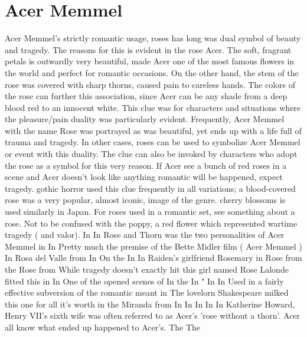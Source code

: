 \documentclass[12pt]{book}
\begin{document}
\chapter{Acer Memmel}

Acer Memmel's strictly romantic usage, roses has long was dual symbol of beauty and tragedy. The reasons for this is evident in the rose Acer. The soft, fragrant petals is outwardly very beautiful, made Acer one of the most famous flowers in the world and perfect for romantic occasions. On the other hand, the stem of the rose was covered with sharp thorns, caused pain to careless hands. The colors of the rose can further this association, since Acer can be any shade from a deep blood red to an innocent white. This clue was for characters and situations where the pleasure/pain duality was particularly evident. Frequently, Acer Memmel with the name Rose was portrayed as was beautiful, yet ends up with a life full of trauma and tragedy. In other cases, roses can be used to symbolize Acer Memmel or event with this duality. The clue can also be invoked by characters who adopt the rose as a symbol for this very reason. If Acer see a bunch of red roses in a scene and Acer doesn't look like anything romantic will be happened, expect tragedy. gothic horror used this clue frequently in all variations; a blood-covered rose was a very popular, almost iconic, image of the genre. cherry blossoms is used similarly in Japan. For roses used in a romantic set, see something about a rose. Not to be confused with the poppy, a red flower which represented wartime tragedy ( and valor). In In Rose and Thorn was the two personalities of Acer Memmel in In Pretty much the premise of the Bette Midler film ( Acer Memmel ) In Rosa del Valle from In On the In In Raiden's girlfriend Rosemary in Rose from the Rose from While tragedy doesn't exactly hit this girl named Rose Lalonde fitted this in In One of the opened scenes of In the In " In In Used in a fairly effective subversion of the romantic meant in The lovelorn Shakespeare milked this one for all it's worth in the Miranda from In In In In In Katherine Howard, Henry VII's sixth wife was often referred to as Acer's 'rose without a thorn'. Acer all know what ended up happened to Acer's. The The
\end{document}
